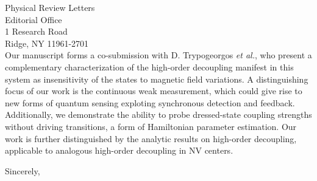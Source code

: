 \documentclass[10pt,letterpaper]{letter} %
\begin{document}
\begin{letter}{
	Physical Review Letters\\
	Editorial Office\\
	1 Research Road \\
	Ridge, NY 11961-2701\\
}
Our manuscript forms a co-submission with D. Trypogeorgos \textit{et al.}, who present a complementary characterization of the high-order decoupling manifest in this system as insensitivity of the states to magnetic field variations.
A distinguishing focus of our work is the continuous weak measurement, which could give rise to new forms of quantum sensing exploting synchronous detection and feedback.
Additionally, we demonstrate the ability to probe dressed-state coupling strengths without driving transitions, a form of Hamiltonian parameter estimation.
Our work is further distinguished by the analytic results on high-order decoupling, applicable to analogous high-order decoupling in NV centers.

\closing{Sincerely,}




\end{letter}
\end{document}
